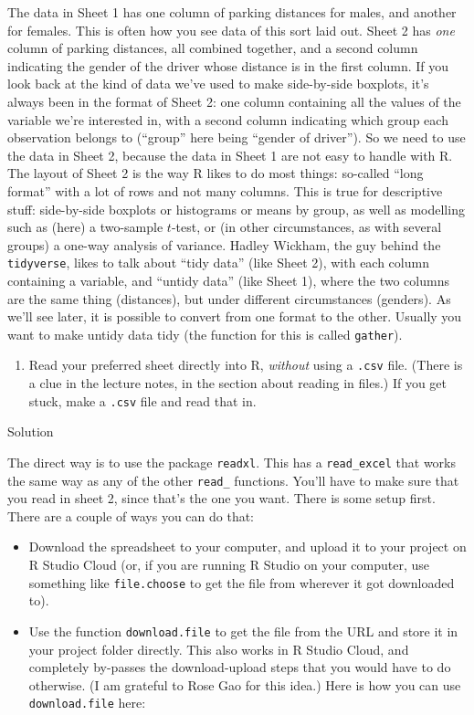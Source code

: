 \documentclass[]{tufte-book}
\providecommand{\tightlist}{%
  \setlength{\itemsep}{0pt}\setlength{\parskip}{0pt}}
\theoremstyle{definition}
\theoremstyle{definition}
\theoremstyle{definition}
\theoremstyle{remark}
\begin{document}
The data in Sheet 1 has one column of parking distances for males, and
another for females. This is often how you see data of this sort laid
out. Sheet 2 has \emph{one} column of parking distances, all combined
together, and a second column indicating the gender of the driver whose
distance is in the first column. If you look back at the kind of data
we've used to make side-by-side boxplots, it's always been in the format
of Sheet 2: one column containing all the values of the variable we're
interested in, with a second column indicating which group each
observation belongs to (``group'' here being ``gender of driver''). So
we need to use the data in Sheet 2, because the data in Sheet 1 are not
easy to handle with R. The layout of Sheet 2 is the way R likes to do
most things: so-called ``long format'' with a lot of rows and not many
columns. This is true for descriptive stuff: side-by-side boxplots or
histograms or means by group, as well as modelling such as (here) a
two-sample \(t\)-test, or (in other circumstances, as with several
groups) a one-way analysis of variance. Hadley Wickham, the guy behind
the \texttt{tidyverse}, likes to talk about ``tidy data'' (like Sheet
2), with each column containing a variable, and ``untidy data'' (like
Sheet 1), where the two columns are the same thing (distances), but
under different circumstances (genders). As we'll see later, it is
possible to convert from one format to the other. Usually you want to
make untidy data tidy (the function for this is called \texttt{gather}).

\begin{enumerate}
\def\labelenumi{(\alph{enumi})}
\setcounter{enumi}{1}
\tightlist
\item
  Read your preferred sheet directly into R, \emph{without} using a
  \texttt{.csv} file. (There is a clue in the lecture notes, in the
  section about reading in files.) If you get stuck, make a
  \texttt{.csv} file and read that in.
\end{enumerate}

Solution

The direct way is to use the package \texttt{readxl}. This has a
\texttt{read\_excel} that works the same way as any of the other
\texttt{read\_} functions. You'll have to make sure that you read in
sheet 2, since that's the one you want. There is some setup first. There
are a couple of ways you can do that:

\begin{itemize}
\item
  Download the spreadsheet to your computer, and upload it to your
  project on R Studio Cloud (or, if you are running R Studio on your
  computer, use something like \texttt{file.choose} to get the file from
  wherever it got downloaded to).
\item
  Use the function \texttt{download.file} to get the file from the URL
  and store it in your project folder directly. This also works in R
  Studio Cloud, and completely by-passes the download-upload steps that
  you would have to do otherwise. (I am grateful to Rose Gao for this
  idea.) Here is how you can use \texttt{download.file} here:
\end{itemize}
\end{document}
